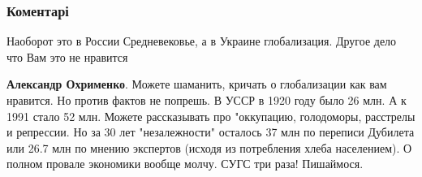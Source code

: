  
 
 
 
 
\subsubsection{Коментарі}
\label{sec:22_10_2021.fb.lukshic_jurij.1.srednevekovie_poliomelit.cmt}

\begin{itemize} %

Наоборот это в России Средневековье, а в Украине глобализация. Другое дело что
Вам это не нравится

\begin{itemize} %
\textbf{Александр Охрименко}. Можете шаманить, кричать о глобализации как вам нравится. Но против фактов не попрешь.
В УССР в 1920 году было 26 млн. А к 1991 стало 52 млн. Можете рассказывать про "оккупацию, голодоморы, расстрелы и репрессии.
Но за 30 лет "незалежности" осталось 37 млн по переписи Дубилета или 26.7 млн по мнению экспертов (исходя из потребления хлеба населением). О полном провале экономики вообще молчу. СУГС три раза! Пишаймося.
\end{itemize} %

\end{itemize} %
